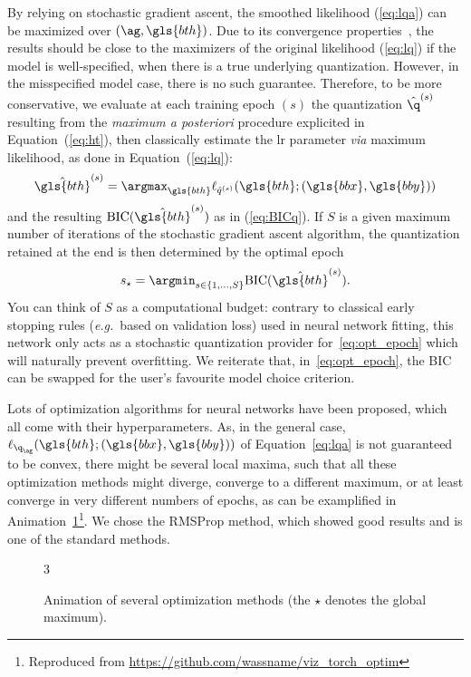 By relying on stochastic gradient ascent, the smoothed likelihood (\ref{eq:lqa}) can be maximized over $\left(\ag, \gls{bth} \right)$. Due to its convergence properties~\cite{bottou2010large}, the results should be close to the maximizers of the original likelihood (\ref{eq:lq}) if the model is well-specified, when there is a true underlying quantization. However, in the misspecified model case, there is no such guarantee. Therefore, to be more conservative, we evaluate at each training epoch $(s)$ the quantization $\hat{\q}^{(s)}$ resulting from the \textit{maximum a posteriori} procedure explicited in Equation~(\ref{eq:ht}), then classically estimate the \gls{lr} parameter \textit{via} maximum likelihood, as done in Equation~(\ref{eq:lq}):
\begin{equation} \label{eq:lr_param_q}
\hat{\gls{bth}}^{(s)} = \argmax_{\gls{bth}} \ell_{\hat{q}^{(s)}}(\gls{bth}; (\gls{bbx},\gls{bby}))
\end{equation}
and the resulting $\mbox{BIC}(\hat{\gls{bth}}^{(s)})$ as in (\ref{eq:BICq}). If $S$ is a given maximum number of iterations of the stochastic gradient ascent algorithm, the quantization retained at the end is then determined by the optimal epoch
\begin{equation} \label{eq:opt_epoch}
s_\star=\argmin_{s\in \{1,\ldots, S\}} \mbox{BIC}(\hat{\gls{bth}}^{(s)}).
\end{equation}
You can think of $S$ as a computational budget: contrary to classical early stopping rules (\textit{e.g.}\ based on validation loss) used in neural network fitting, this network only acts as a stochastic quantization provider for~\eqref{eq:opt_epoch} which will naturally prevent overfitting. We reiterate that, in~\eqref{eq:opt_epoch}, the BIC can be swapped for the user's favourite model choice criterion.

Lots of optimization algorithms for neural networks have been proposed, which all come with their hyperparameters. As, in the general case, $\ell_{\q_{\ag}}(\gls{bth} ; (\gls{bbx},\gls{bby}))$ of Equation~\eqref{eq:lqa} is not guaranteed to be convex, there might be several local maxima, such that all these optimization methods might diverge, converge to a different maximum, or at least converge in very different numbers of epochs, as can be examplified in Animation~\ref{fig:anim_sgd}\footnote{Reproduced from \url{https://github.com/wassname/viz_torch_optim}}. We chose the RMSProp method, which showed good results and is one of the standard methods.

\begin{figure}[!ht]
\begin{animateinline}[poster=first, controls=all, palindrome, autopause, autoresume, width=\textwidth]{3}
%
\end{animateinline}
\caption{\label{fig:anim_sgd} Animation of several optimization methods (the $\star$ denotes the global maximum).}
\end{figure}

